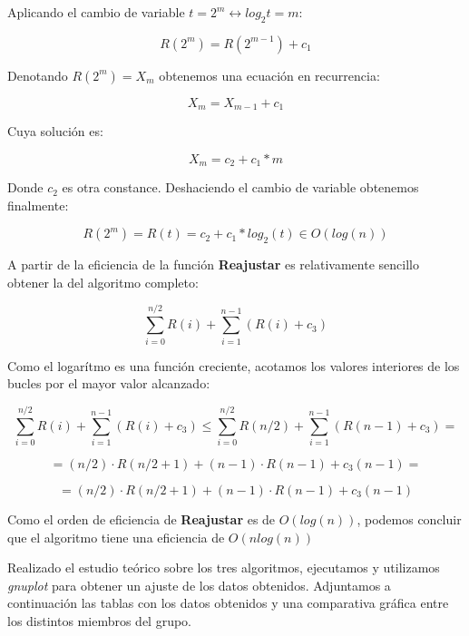 \documentclass[11pt,a4paper]{article}
\begin{document}
Aplicando el cambio de variable $t = 2^m \leftrightarrow log_2 t = m$:

$$R(2^m) = R(2^{m-1}) + c_1$$

Denotando $R(2^m) = X_m$ obtenemos una ecuación en recurrencia:

$$X_m = X_{m-1} + c_1$$

Cuya solución es:

$$X_m = c_2 + c_1 * m$$

Donde $c_2$ es otra constance. Deshaciendo el cambio de variable obtenemos finalmente:

$$R(2^m) = R(t) = c_2 + c_1 * log_2(t) \in O(log(n))$$

A partir de la eficiencia de la función \textbf{Reajustar} es relativamente sencillo obtener la del algoritmo completo:

$$\sum_{i=0}^{n/2} R(i) + \sum_{i=1}^{n-1} (R(i) + c_3) $$

Como el logarítmo es una función creciente, acotamos los valores interiores de los bucles por el mayor valor alcanzado:

$$\sum_{i=0}^{n/2} R(i) + \sum_{i=1}^{n-1} (R(i) + c_3) \leq \sum_{i=0}^{n/2} R(n/2) + \sum_{i=1}^{n-1} (R(n-1) + c_3) = $$

$$= (n/2) \cdot R(n/2 + 1) + (n-1) \cdot R(n - 1) + c_3(n-1) = $$

$$= (n/2) \cdot R(n/2 + 1) + (n-1) \cdot R(n - 1) + c_3(n-1)$$

Como el orden de eficiencia de \textbf{Reajustar} es de $O(log(n))$, podemos concluir que el algoritmo tiene una eficiencia de $O(nlog(n))$

Realizado el estudio teórico sobre los tres algoritmos, ejecutamos y utilizamos \emph{gnuplot} para obtener un ajuste de los datos obtenidos. Adjuntamos a continuación las tablas con los datos obtenidos y una comparativa gráfica entre los distintos miembros del grupo. 
\end{document}
